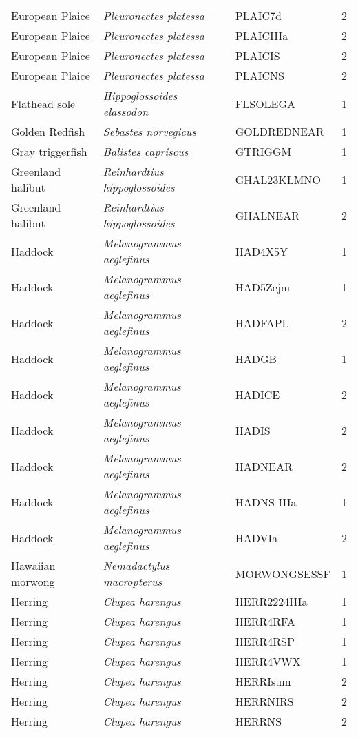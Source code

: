 \begin{center}
\begin{footnotesize}
\begin{longtable}{l | l | l | r}
European Plaice & \textit{Pleuronectes platessa} & PLAIC7d & 2 \\
European Plaice & \textit{Pleuronectes platessa} & PLAICIIIa & 2 \\
European Plaice & \textit{Pleuronectes platessa} & PLAICIS & 2 \\
European Plaice & \textit{Pleuronectes platessa} & PLAICNS & 2 \\
Flathead sole & \textit{Hippoglossoides elassodon} & FLSOLEGA & 1 \\
Golden Redfish & \textit{Sebastes norvegicus} & GOLDREDNEAR & 1 \\
Gray triggerfish & \textit{Balistes capriscus} & GTRIGGM & 1 \\
Greenland halibut & \textit{Reinhardtius hippoglossoides} & GHAL23KLMNO & 1 \\
Greenland halibut & \textit{Reinhardtius hippoglossoides} & GHALNEAR & 2 \\
Haddock & \textit{Melanogrammus aeglefinus} & HAD4X5Y & 1 \\
Haddock & \textit{Melanogrammus aeglefinus} & HAD5Zejm & 1 \\
Haddock & \textit{Melanogrammus aeglefinus} & HADFAPL & 2 \\
Haddock & \textit{Melanogrammus aeglefinus} & HADGB & 1 \\
Haddock & \textit{Melanogrammus aeglefinus} & HADICE & 2 \\
Haddock & \textit{Melanogrammus aeglefinus} & HADIS & 2 \\
Haddock & \textit{Melanogrammus aeglefinus} & HADNEAR & 2 \\
Haddock & \textit{Melanogrammus aeglefinus} & HADNS-IIIa & 1 \\
Haddock & \textit{Melanogrammus aeglefinus} & HADVIa & 2 \\
Hawaiian morwong & \textit{Nemadactylus macropterus} & MORWONGSESSF & 1 \\
Herring & \textit{Clupea harengus} & HERR2224IIIa & 1 \\
Herring & \textit{Clupea harengus} & HERR4RFA & 1 \\
Herring & \textit{Clupea harengus} & HERR4RSP & 1 \\
Herring & \textit{Clupea harengus} & HERR4VWX & 1 \\
Herring & \textit{Clupea harengus} & HERRIsum & 2 \\
Herring & \textit{Clupea harengus} & HERRNIRS & 2 \\
Herring & \textit{Clupea harengus} & HERRNS & 2 \\

\end{longtable}
\end{footnotesize}
\end{center}
